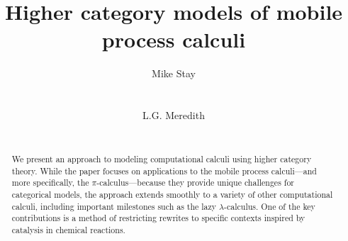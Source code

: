\documentclass[]{acm_proc_article-sp}
\numberwithin{equation}{subsection}
\newcommand{\pic}{$\pi$-calculus}
\newcommand{\papertitle}{Higher category models of mobile process calculi}
\begin{document}
\lstset{language=}

\setlength{\topmargin}{0in}
\setlength{\textheight}{8.5in}
\setlength{\parskip}{6pt}

\title{\papertitle}

\author{
\alignauthor
Mike Stay\\
  \\
   \\
\alignauthor 
L.G. Meredith\\
  \\
}










\begin{abstract}
\normalsize{ 

  We present an approach to modeling computational calculi using
  higher category theory.  While the paper focuses on applications to
  the mobile process calculi---and more specifically, the 
  {\pic}---because they provide unique challenges for categorical 
  models, the approach extends smoothly to a variety of other computational
  calculi, including important milestones such as the lazy 
  $\lambda$-calculus. One of the key contributions is a method of
  restricting rewrites to specific contexts inspired by catalysis in
  chemical reactions.

}

\end{abstract}
\end{document}
